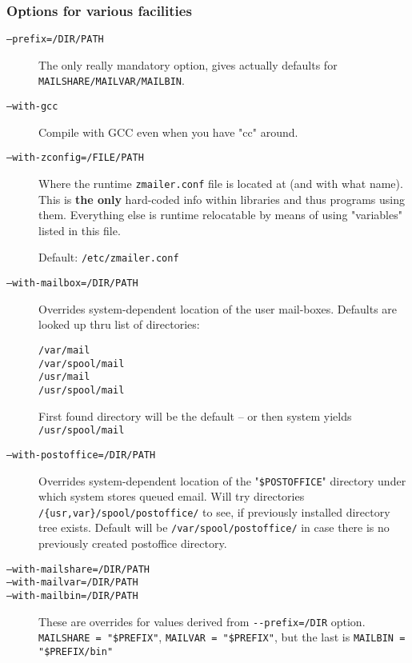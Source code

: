 \begin{multicols}{2}
\subsubsection{Options for various facilities}

\begin{description}
\item[\tt --prefix=/DIR/PATH] \mbox{}

The only really mandatory option, gives actually
defaults for \verb:MAILSHARE/MAILVAR/MAILBIN:.

\item[\tt --with-gcc] \mbox{}

Compile with GCC even when you have "cc" around.

\item[\tt --with-zconfig=/FILE/PATH] \mbox{}

Where the runtime   {\tt zmailer.conf}   file is located
at (and with what name).  This is {\bf the only} hard-coded
info within libraries and thus programs using them.
Everything else is runtime relocatable by means of using
"variables" listed in this file.

Default: {\tt /etc/zmailer.conf}

\item[\tt --with-mailbox=/DIR/PATH] \mbox{}

Overrides system-dependent location of the user mail-boxes.
Defaults are looked up thru list of directories:
\begin{alltt}
 /var/mail
 /var/spool/mail
 /usr/mail
 /usr/spool/mail
\end{alltt}
First found directory will be the default -- or then
system yields  {\tt /usr/spool/mail}

\item[\tt --with-postoffice=/DIR/PATH] \mbox{}

Overrides system-dependent location of the "{\tt \$POSTOFFICE}"
directory under which system stores queued email.
Will try directories \verb:/{usr,var}/spool/postoffice/: to
see, if previously installed directory tree exists.
Default will be  \verb:/var/spool/postoffice/:
in case there is no previously created postoffice directory.

\item[\tt --with-mailshare=/DIR/PATH]
\item[\tt --with-mailvar=/DIR/PATH]
\item[\tt --with-mailbin=/DIR/PATH] \mbox{}

These are overrides for values derived from  \verb:--prefix=/DIR:
option.  {\tt MAILSHARE = "\$PREFIX"}, {\tt MAILVAR = "\$PREFIX"},
but the last is {\tt MAILBIN = "\$PREFIX/bin"}


\end{description}
\end{multicols}
